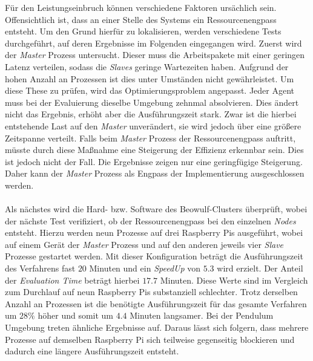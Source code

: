 Für den Leistungseinbruch können verschiedene Faktoren ursächlich sein. Offensichtlich ist, dass an einer Stelle des Systems ein Ressourcenengpass entsteht. Um den Grund hierfür zu lokalisieren, werden verschiedene Tests durchgeführt, auf deren Ergebnisse im Folgenden eingegangen wird. Zuerst wird der \emph{Master} Prozess untersucht. Dieser muss die Arbeitspakete mit einer geringen Latenz verteilen, sodass die \emph{Slaves} geringe Wartezeiten haben. Aufgrund der hohen Anzahl an Prozessen ist dies unter Umständen nicht gewährleistet. Um diese These zu prüfen, wird das Optimierungsproblem angepasst. Jeder Agent muss bei der Evaluierung dieselbe Umgebung zehnmal absolvieren. Dies ändert nicht das Ergebnis, erhöht aber die Ausführungszeit stark. Zwar ist die hierbei entstehende Last auf den \emph{Master} unverändert, sie wird jedoch über eine größere Zeitspanne verteilt. Falls beim \emph{Master} Prozess der Ressourcenengpass auftritt, müsste durch diese Maßnahme eine Steigerung der Effizienz erkennbar sein. Dies ist jedoch nicht der Fall. Die Ergebnisse zeigen nur eine geringfügige Steigerung. Daher kann der \emph{Master} Prozess als Engpass der Implementierung ausgeschlossen werden. 
\\\\
Als nächstes wird die Hard- bzw. Software des Beowulf-Clusters überprüft, wobei der nächste Test verifiziert, ob der Ressourcenengpass bei den einzelnen \emph{Nodes} entsteht. Hierzu werden neun Prozesse auf drei Raspberry Pis ausgeführt, wobei auf einem Gerät der \emph{Master} Prozess und auf den anderen jeweils vier \emph{Slave} Prozesse gestartet werden. Mit dieser Konfiguration beträgt die Ausführungszeit des Verfahrens fast $20$ Minuten und ein \emph{SpeedUp} von $5.3$ wird erzielt. Der Anteil der \emph{Evaluation Time} beträgt hierbei $17.7$ Minuten. Diese Werte sind im Vergleich zum Durchlauf auf neun Raspberry Pis substanziell schlechter. Trotz derselben Anzahl an Prozessen ist die benötigte Ausführungszeit für das gesamte Verfahren um $28\%$ höher und somit um $4.4$ Minuten langsamer. Bei der Pendulum Umgebung treten ähnliche Ergebnisse auf. Daraus lässt sich folgern, dass mehrere Prozesse auf demselben Raspberry Pi sich teilweise gegenseitig blockieren und dadurch eine längere Ausführungszeit entsteht. 
\\\\

